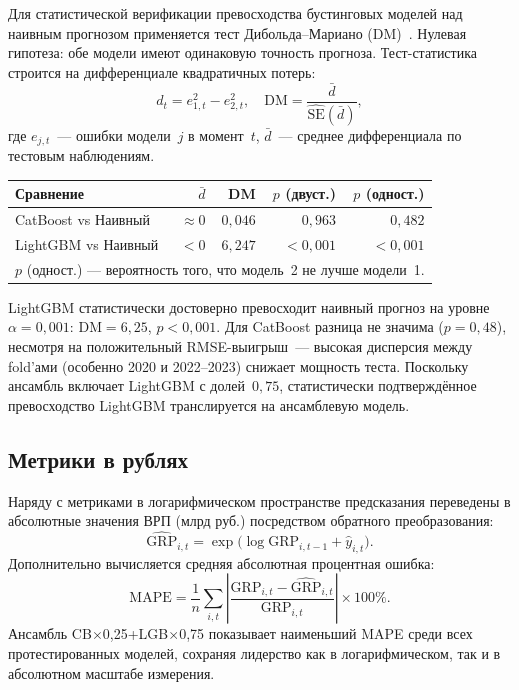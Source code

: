 \documentclass[12pt,a4paper]{article}
\begin{document}
Для статистической верификации превосходства бустинговых моделей над наивным
прогнозом применяется тест Дибольда--Мариано (DM)~\cite{diebold1995}.
Нулевая гипотеза: обе модели имеют одинаковую точность прогноза.
Тест-статистика строится на дифференциале квадратичных потерь:
\begin{equation}
  d_t = e^2_{1,t} - e^2_{2,t}, \quad
  \mathrm{DM} = \frac{\bar{d}}{\widehat{\mathrm{SE}}(\bar{d})},
\end{equation}
где $e_{j,t}$~--- ошибки модели~$j$ в момент~$t$,
$\bar{d}$~--- среднее дифференциала по тестовым наблюдениям.

\begin{center}
\small
\begin{tabular}{lrrrr}
\toprule
Сравнение & $\bar{d}$ & DM & $p$ (двуст.) & $p$ (одност.) \\
\midrule
CatBoost vs Наивный  & $\approx 0$ & $0{,}046$ & $0{,}963$ & $0{,}482$ \\
LightGBM vs Наивный  & $< 0$       & $6{,}247$ & $<0{,}001$ & $<0{,}001$ \\
\bottomrule
\multicolumn{5}{l}{\scriptsize $p$ (одност.) --- вероятность того, что модель~2 не лучше модели~1.}
\end{tabular}
\end{center}

LightGBM статистически достоверно превосходит наивный прогноз на уровне
$\alpha = 0{,}001$: $\mathrm{DM} = 6{,}25$, $p < 0{,}001$.
Для CatBoost разница не значима ($p = 0{,}48$), несмотря на положительный
RMSE-выигрыш~--- высокая дисперсия между fold'ами (особенно 2020 и 2022--2023)
снижает мощность теста. Поскольку ансамбль включает LightGBM с долей~$0{,}75$,
статистически подтверждённое превосходство LightGBM транслируется на
ансамблевую модель.

\subsection{Метрики в рублях}

Наряду с метриками в логарифмическом пространстве предсказания переведены
в абсолютные значения ВРП (млрд руб.) посредством обратного преобразования:
\begin{equation}
  \widehat{\mathrm{GRP}}_{i,t} =
  \exp\!\bigl(\log\mathrm{GRP}_{i,t-1} + \hat{y}_{i,t}\bigr).
\end{equation}
Дополнительно вычисляется средняя абсолютная процентная ошибка:
\begin{equation}
  \mathrm{MAPE} = \frac{1}{n}\sum_{i,t}
  \left|\frac{\mathrm{GRP}_{i,t} - \widehat{\mathrm{GRP}}_{i,t}}
  {\mathrm{GRP}_{i,t}}\right| \times 100\%.
\end{equation}
Ансамбль CB$\times$0{,}25+LGB$\times$0{,}75 показывает наименьший MAPE среди
всех протестированных моделей, сохраняя лидерство как в логарифмическом,
так и в абсолютном масштабе измерения.
\end{document}
